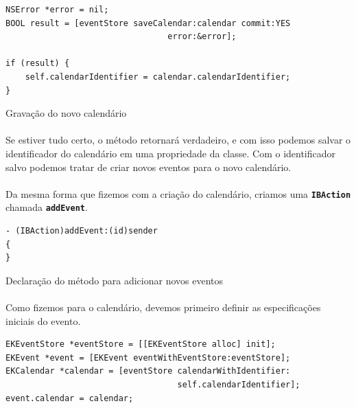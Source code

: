 \documentclass[a4paper,12pt,brazil,doubleside]{book}
\begin{document}
\begin{singlespace}
\begin{listing}[H]
\begin{verbatim}
NSError *error = nil;
BOOL result = [eventStore saveCalendar:calendar commit:YES
                                 error:&error];

if (result) {
	self.calendarIdentifier = calendar.calendarIdentifier;
}
\end{verbatim}
\caption{Gravação do novo calendário}
\end{listing}

\paragraph{}Se estiver tudo certo, o método retornará verdadeiro, e com isso podemos salvar o identificador do calendário em uma propriedade da classe. Com o identificador salvo podemos tratar de criar novos eventos para o novo calendário.
\paragraph{}Da mesma forma que fizemos com a criação do calendário, criamos uma \texttt{\textbf{IBAction}} chamada \texttt{\textbf{addEvent}}.

\begin{listing}[H]
\begin{verbatim}
- (IBAction)addEvent:(id)sender
{
}
\end{verbatim}
\caption{Declaração do método para adicionar novos eventos}
\end{listing}

\paragraph{}Como fizemos para o calendário, devemos primeiro definir as especificações iniciais do evento.

\begin{listing}[H]
\begin{verbatim}
EKEventStore *eventStore = [[EKEventStore alloc] init];
EKEvent *event = [EKEvent eventWithEventStore:eventStore];
EKCalendar *calendar = [eventStore calendarWithIdentifier:
                                   self.calendarIdentifier];
event.calendar = calendar;
    

\end{verbatim}
\end{listing}
\end{singlespace}
\end{document}
